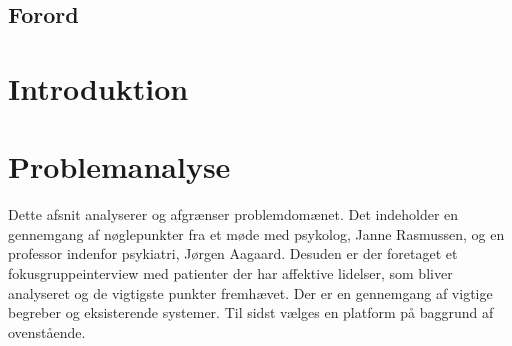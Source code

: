 %
%
%
%
% 



\pagestyle{empty} %
%
%
\listoftodos
\cleardoublepage

\cleardoublepage

\section*{Forord}

\cleardoublepage

\pagestyle{fancy} %
\setcounter{tocdepth}{1}
\tableofcontents

%
\cleardoublepage

\chapter*{Introduktion}


\chapter{Problemanalyse}
Dette afsnit analyserer og afgrænser problemdomænet.
Det indeholder en gennemgang af nøglepunkter fra et møde med psykolog, Janne Rasmussen, og en professor indenfor psykiatri, Jørgen Aagaard.
Desuden er der foretaget et fokusgruppeinterview med patienter der har affektive lidelser, som bliver analyseret og de vigtigste punkter fremhævet.
Der er en gennemgang af vigtige begreber og eksisterende systemer.
Til sidst vælges en platform på baggrund af ovenstående.

